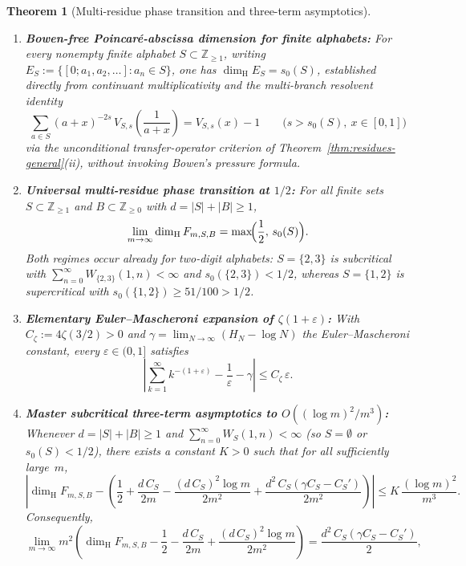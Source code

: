 \documentclass[11pt]{article}
\newtheorem{theorem}{Theorem}
\theoremstyle{definition}
\theoremstyle{remark}
\newcommand{\Z}{\mathbb{Z}}
\newcommand{\dimH}{\dim_{\mathrm{H}}}
\begin{document}
\begin{theorem}[Multi-residue phase transition and three-term asymptotics]\label{thm:multi-residue-asymptotic}
\begin{enumerate}[label=\textup{(\roman*)},leftmargin=2.2em]
\item \textbf{Bowen-free Poincar\'e-abscissa dimension for finite alphabets:}
For every nonempty finite alphabet $S\subset\Z_{\ge1}$, writing
$E_S:=\{[0;a_1,a_2,\dots]:a_n\in S\}$, one has $\dimH E_S=s_0(S)$, established
directly from continuant multiplicativity and the multi-branch resolvent
identity
\begin{equation}\label{eq:multi-resolvent-branch}
\sum_{a\in S}(a+x)^{-2s}\,V_{S,s}\!\left(\frac{1}{a+x}\right)=V_{S,s}(x)-1
\qquad\bigl(s>s_0(S),\ x\in[0,1]\bigr)
\end{equation}
via the unconditional transfer-operator criterion of Theorem~\ref{thm:residues-general}\textup{(ii)},
without invoking Bowen's pressure formula.
\item \textbf{Universal multi-residue phase transition at $1/2$:}
For all finite sets $S\subset\Z_{\ge1}$ and $B\subset\Z_{\ge0}$ with
$d=|S|+|B|\ge1$,
\[
\lim_{m\to\infty}\dimH F_{m,S,B}=\max\!\Bigl(\frac12,\,s_0(S)\Bigr).
\]
Both regimes occur already for two-digit alphabets: $S=\{2,3\}$ is subcritical
with $\sum_{n=0}^\infty W_{\{2,3\}}(1,n)<\infty$ and $s_0(\{2,3\})<1/2$, whereas
$S=\{1,2\}$ is supercritical with $s_0(\{1,2\})\ge 51/100>1/2$.
\item \textbf{Elementary Euler--Mascheroni expansion of $\zeta(1+\varepsilon)$:}
With $C_\zeta:=4\zeta(3/2)>0$ and $\gamma=\lim_{N\to\infty}(H_N-\log N)$ the
Euler--Mascheroni constant, every $\varepsilon\in(0,1]$ satisfies
\[
\left|\sum_{k=1}^\infty k^{-(1+\varepsilon)}-\frac{1}{\varepsilon}-\gamma\right|
\le C_\zeta\,\varepsilon.
\]
\item \textbf{Master subcritical three-term asymptotics to $O((\log m)^2/m^3)$:}
Whenever $d=|S|+|B|\ge1$ and $\sum_{n=0}^\infty W_S(1,n)<\infty$
(so $S=\emptyset$ or $s_0(S)<1/2$), there exists a constant $K>0$ such that for
all sufficiently large~$m$,
\begin{equation}\label{eq:multi-dimH-three-term}
\left|\dimH F_{m,S,B}-\left(\frac12+\frac{d\,C_S}{2m}-\frac{(d\,C_S)^2\log m}{2m^2}+\frac{d^2\,C_S(\gamma C_S-C_S')}{2m^2}\right)\right|
\le K\,\frac{(\log m)^2}{m^3}.
\end{equation}
Consequently,
\[
\lim_{m\to\infty}m^2\!\left(\dimH F_{m,S,B}-\frac12-\frac{d\,C_S}{2m}+\frac{(d\,C_S)^2\log m}{2m^2}\right)
=\frac{d^2\,C_S(\gamma C_S-C_S')}{2},
\]
\end{enumerate}
\end{theorem}
\end{document}
